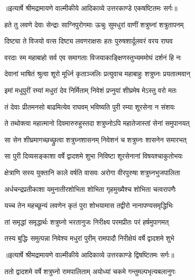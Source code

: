 {॥इत्यार्षे श्रीमद्रामायणे वाल्मीकीये आदिकाव्ये उत्तरकाण्डे एकषष्टितमः सर्गः॥}


\twolineshloka
{हते तु लवणे देवाः सेन्द्राः साग्निपुरोगमाः}
{ऊचुः सुमधुरां वाणीं शत्रुघ्नां शत्रुतापनम्} %

\twolineshloka
{दिष्ट्या ते विजयो वत्स दिष्ट्य लवणराक्षसः}
{हतः पुरुषशार्दूलवरं वरय राघव} %

\twolineshloka
{वरदाः स्म महाबाहो सर्व एव समागताः}
{विजयाकाङ्क्षिणस्तुभ्यममोघं दर्शनं हि नः} %

\twolineshloka
{देवानां भाषितं श्रुत्वा शूरो मूर्ध्नि कृताञ्जलिः}
{प्रत्युवाच महाबाहुः शत्रुघ्नः प्रयतात्मवान्} %

\twolineshloka
{इमां मधुपुरीं रम्यां मधुरां देव निर्मिताम्}
{निवेशं प्रप्नुयां शीघ्रमेष मेऽस्तु वरो मतः} %

\twolineshloka
{तं देवाः प्रीतमनसो बाढमित्येव राघवम्}
{भविष्यति पुरी रम्या शूरसेना न संशयः} %

\twolineshloka
{ते तथोक्त्वा महात्मानो दिवमारुरुहुस्तदा}
{शत्रुघ्नोऽपि महातेजास्तां सेनां समुपानयत्} %

\twolineshloka
{सा सेन शीघ्रमागच्छच्छ्रुत्वा शत्रुघ्नशासनम्}
{निवेशनं च शत्रुघ्नः शासनेन समारभत्} %

\twolineshloka
{सा पुरी दिव्यसङ्काशा वर्षे द्वादशमे शुभा}
{निविष्टा शूरसेनानां विषयश्चाकुतोभयः} %

\twolineshloka
{क्षेत्राणि सस्य युक्तानि काले वर्षति वासवः}
{अरोगा वीरपुरुषा शत्रुघ्नभुजपालिता} %

\twolineshloka
{अर्धचन्द्रप्रतीकाशा यमुनातीरशोभिता}
{शोभिता गृहमुख्यैश्च शोभिता चत्वरापणैः} %

\twolineshloka
{यच्च तेन महच्छून्यं लवणेन कृतं पुरा}
{शोभयामास तद्वीरो नानापण्यसमृद्धिभिः} %

\twolineshloka
{तां समृद्धां समृद्धार्थः शत्रुघ्नो भरतानुजः}
{निरीक्ष्य परमप्रीतः परं हर्षमुपागमत्} %

\twolineshloka
{तस्य बुद्धिः समुत्पन्ना निवेश्य मधुरां पुरीम्}
{रामपादौ निरीक्षेयं वर्षे द्वादशमे शुभे} %


{॥इत्यार्षे श्रीमद्रामायणे वाल्मीकीये आदिकाव्ये उत्तरकाण्डे द्विषष्टितमः सर्गः॥}


\twolineshloka
{ततो द्वादशमे वर्षे शत्रुघ्नो रामपालिताम्}
{अयोध्यां चकमे गन्तुमल्पभृत्यबलानुगः} %


